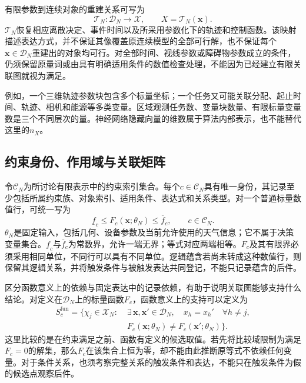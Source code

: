 有限参数到连续对象的重建关系可写为
\begin{equation}
 \mathcal T_N:\mathcal D_N\longrightarrow\mathscr X,
 \qquad X=\mathcal T_N(\mathbf x).
 \label{s0510:reconstruction}
\end{equation}
$\mathcal T_N$恢复相应离散决定、事件时间以及所采用参数化下的轨迹和控制函数。该映射描述表达方式，并不保证其像覆盖原连续模型的全部可行解，也不保证每个$\mathbf x\in\mathcal D_N$重建出的对象均可行。对全部时间、视线参数或障碍物参数成立的条件，仍须保留原量词或由具有明确适用条件的数值检查处理，不能因为已经建立有限关联图就视为满足。

例如，一个三维轨迹参数块包含多个标量坐标；一个任务又可能关联分配、起止时间、轨迹、相机和能源等多类变量。区域观测任务数、变量块数量、有限标量变量数是三个不同层次的量。神经网络隐藏向量的维数属于算法内部表示，也不能替代这里的$n_X$。

\subsection{约束身份、作用域与关联矩阵}

令$\mathcal C_N$为所讨论有限表示中的约束索引集合。每个$c\in\mathcal C_N$具有唯一身份，其记录至少包括所属约束族、对象索引、适用条件、表达式和关系类型。对一个普通标量数值行，可统一写为
\begin{equation}
 \underline f_c\le F_c(\mathbf x;\theta_N)\le\overline f_c,
 \qquad c\in\mathcal C_N.
 \label{s0510:row_form}
\end{equation}
$\theta_N$是固定输入，包括几何、设备参数及当前允许使用的天气信息；它不属于决策变量集合。$\underline f_c$与$\overline f_c$为常数界，允许一端无界；等式对应两端相等。$F_c$及其有限界必须采用相同单位，不同行可以具有不同单位。逻辑蕴含若尚未转成这种数值行，则保留其逻辑关系，并将触发条件与被触发表达共同登记，不能只记录蕴含的后件。

区分函数意义上的依赖与固定表达中的记录依赖，有助于说明关联图能够支持什么结论。对定义在$\mathcal D_N$上的标量函数$F_c$，函数意义上的支持可以定义为
\begin{equation}
 \begin{split}
 S_c^{\mathrm{fun}}=\{\chi_j\in\mathcal X_N:\;&
 \exists\,\mathbf x,\mathbf x'\in\mathcal D_N,
 \quad x_h=x_h'\quad\forall h\ne j,\\
 &F_c(\mathbf x;\theta_N)\ne
 F_c(\mathbf x';\theta_N)\}.
 \end{split}
 \label{s0510:functional_support}
\end{equation}
这里比较的是在约束满足之前、函数有定义的候选取值。若先将比较域限制为满足$F_c=0$的解集，那么$F_c$在该集合上恒为零，却不能由此推断原等式不依赖任何变量。对于条件关系，也须考察完整关系的触发条件和表达，不能只在触发条件为假的候选点观察后件。

